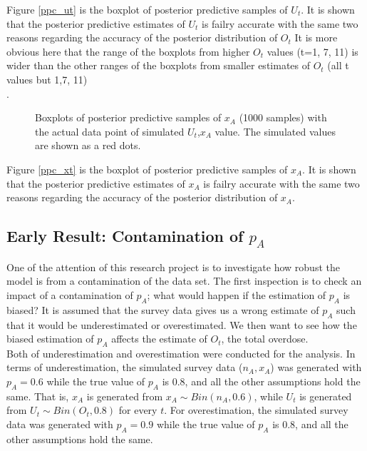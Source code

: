 \documentclass[
10pt, %
a4paper, %
oneside, %
headinclude,footinclude, %
BCOR5mm, %
]{scrartcl}
\begin{document}
Figure \ref{ppc_ut} is the boxplot of posterior predictive samples of $U_t$. It is shown that the posterior predictive estimates of $U_t$ is failry accurate with the same two reasons regarding the accuracy of the posterior distribution of $O_t$ It is more obvious here that the range of the boxplots from  higher $O_t$ values (t=1, 7, 11) is wider than the other ranges of the boxplots from smaller estimates of $O_t$ (all t values but 1,7, 11)\\.

\begin{figure}[htb]
	\centering
	\caption[two early result box plots:]{Boxplots of posterior predictive samples of $x_A$ (1000 samples) with the actual data point of simulated $U_t$,$x_A$ value. The simulated values are shown as a red dots.}
	
\end{figure}

Figure \ref{ppc_xt} is the boxplot of posterior predictive samples of $x_A$. It is shown that the posterior predictive estimates of $x_A$ is failry accurate with the same two reasons regarding the accuracy of the posterior distribution of $x_A$.\\
 


\subsection{Early Result: Contamination of $p_A$ } 
One of the attention of this research project is to investigate how robust the model is from a contamination of the data set. The first inspection is to check an impact of a contamination of $p_A$; what would happen if the estimation of $p_A$ is biased? It is assumed that the survey data gives us a wrong estimate of $p_A$ such that it would be underestimated or overestimated. We then want to see how the biased estimation of $p_A$ affects the estimate of $O_t$, the total overdose.\\

Both of underestimation and overestimation were conducted for the analysis. In terms of underestimation, the simulated survey data ($n_A, x_A$) was generated with $p_A=0.6$ while the true value of $p_A$ is 0.8, and all the other assumptions hold the same. That is, $x_A$ is generated from $x_A \sim Bin(n_A, 0.6)$, while $U_t$ is generated from $U_t \sim Bin(O_t, 0.8)$ for every $t$. For overestimation, the simulated survey data was generated with $p_A=0.9$ while the true value of $p_A$ is 0.8, and all the other assumptions hold the same.  \\
\end{document}
